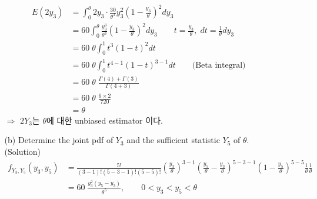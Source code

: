 \documentclass{oblivoir}
\newcommand{\flr}[1]{\left ( #1 \right )}
\newcommand{\blue}[1]{{\color{blue} #1}}
\begin{document}
\begin{enumerate}
\begin{enumerate}
\begin{align*}
\end{align*}
\begin{align*}
E(2y_3) &= \int_0^{\theta} 2y_3 \cdot \frac{30}{\theta^3} y_3^2 \flr{1-\frac{y_3}{\theta}}^2 dy_3 \\
&= 60 \int_0^{\theta} \frac{y_3^3}{\theta^3} \flr{1-\frac{y_3}{\theta}}^2 dy_3 \qquad t = \frac{y_3}{\theta}, \; dt = \frac{1}{\theta} dy_3 \\
&= 60 \; \theta \int_0^1 t^3 (1-t)^2 dt \\
&= 60 \; \theta \int_0^1 t^{4-1} (1-t)^{3-1} dt \qquad \mbox{(Beta integral)} \\
&= 60 \; \theta \; \frac{\Gamma(4) + \Gamma(3)}{\Gamma(4+3)} \\
&= 60 \; \theta \; \frac{6 \times 2}{720} \\
&= \theta
\end{align*}
$\Rightarrow$ $2Y_3$는 $\theta$에 대한 unbiased estimator 이다.

\vspace{3mm}
\item[(b)]
Determine the joint pdf of $Y_3$ and the sufficient statistic $Y_5$ of $\theta$. \\
\blue{(Solution)}
\begin{align*}
f_{Y_3, Y_5}(y_3,y_5) &= \frac{5!}{(3-1)!(5-3-1)!(5-5)!} \flr{\frac{y_3}{\theta}}^{3-1} \flr{\frac{y_5}{\theta} - \frac{y_3}{\theta}}^{5-3-1} \flr{1-\frac{y_5}{\theta}}^{5-5} \frac{1}{\theta} \frac{1}{\theta} \\
&=60 \; \frac{y_3^2(y_5-y_3)}{\theta^5}, \qquad 0 < y_3 < y_5 < \theta
\end{align*}


\end{enumerate}
\end{enumerate}
\end{document}
